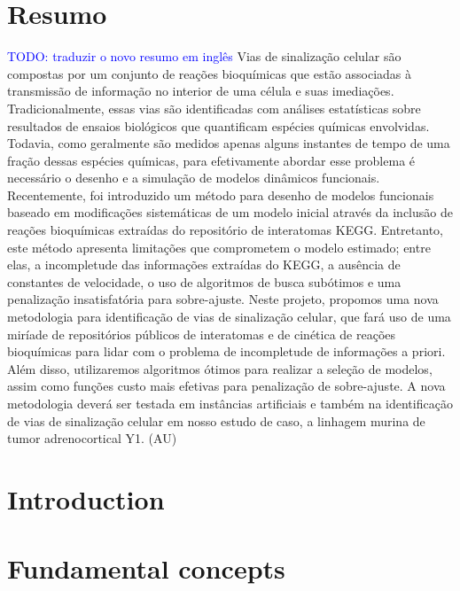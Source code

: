 \documentclass[12pt, twoside]{report}
\numberwithin{mydefinition}{section}
\numberwithin{mytheorem}{section}
\numberwithin{mylemma}{section}
\numberwithin{corollary}{section}
\begin{document}
\chapter*{Resumo}
{\textcolor{blue}{TODO: traduzir o novo resumo em inglês}}
Vias de sinalização celular são compostas por um conjunto de reações
bioquímicas que estão associadas à transmissão de informação no interior
de uma célula e suas imediações. Tradicionalmente, essas vias são
identificadas com análises estatísticas sobre resultados de ensaios
biológicos que quantificam espécies químicas envolvidas. Todavia, como
geralmente são medidos apenas alguns instantes de tempo de uma fração
dessas espécies químicas, para efetivamente abordar esse problema é
necessário o desenho e a simulação de modelos dinâmicos funcionais.
Recentemente, foi introduzido um método para desenho de modelos
funcionais baseado em modificações sistemáticas de um modelo inicial
através da inclusão de reações bioquímicas extraídas do repositório de
interatomas KEGG. Entretanto, este método apresenta limitações que
comprometem o modelo estimado; entre elas, a incompletude das
informações extraídas do KEGG, a ausência de constantes de velocidade, o
uso de algoritmos de busca subótimos e uma penalização insatisfatória
para sobre-ajuste. Neste projeto, propomos uma nova metodologia para
identificação de vias de sinalização celular, que fará uso de uma
miríade de repositórios públicos de interatomas e de cinética de reações
bioquímicas para lidar com o problema de incompletude de informações a
priori. Além disso, utilizaremos algoritmos ótimos para realizar a
seleção de modelos, assim como funções custo mais efetivas para
penalização de sobre-ajuste. A nova metodologia deverá ser testada em
instâncias artificiais e também na identificação de vias de sinalização
celular em nosso estudo de caso, a linhagem murina de tumor
adrenocortical Y1. (AU)
 
\tableofcontents

\clearpage
{} 

\nocite{*}
\chapter{Introduction}
\label{chap:intro}


\chapter{Fundamental concepts}
\label{chap:fundamental_concepts}

\end{document}
